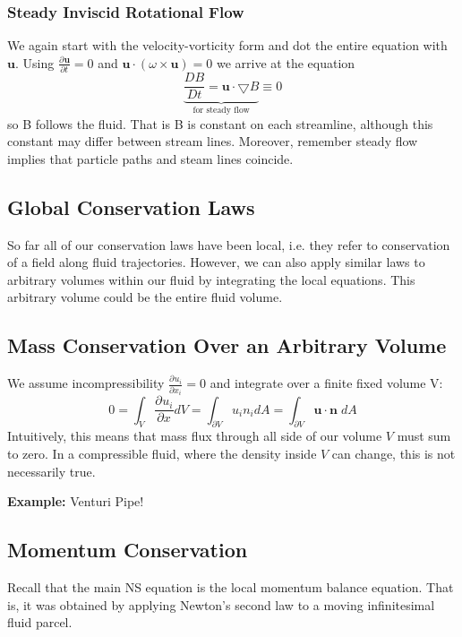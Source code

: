 \documentclass[11pt]{article}
\newcommand*{\pd}[3][]{\ensuremath{\frac{\partial^{#1} {#2}}{\partial {#3}^{#1}}}}
\newcommand*{\md}[1]{\ensuremath{\frac{D #1}{D t}}}
\newcommand{\grad}{\bigtriangledown}
\newcommand{\mv}[1]{\bm{#1}}
\newenvironment{eg}
{\begin{mdframed}[backgroundcolor=mylg, roundcorner=5pt, linewidth=0pt]\textbf{Example: }\normalfont}
    {\end{mdframed}}
\begin{document}
\subsubsection{Steady Inviscid Rotational Flow}
We again start with the velocity-vorticity form and dot the entire equation with $\mv{u}$. Using $\pd{\mv{u}}{t}=0$ and $\mv{u}\cdot(\omega\times\mv{u})=0$ we arrive at the equation
$$\underbrace{\md{B}=\mv{u}\cdot\grad B}_{\text{for steady flow}} \equiv 0$$
so B follows the fluid. That is B is constant on each streamline, although this constant may differ between stream lines. Moreover, remember steady flow implies that particle paths and steam lines coincide.
\subsection{Global Conservation Laws}
So far all of our conservation laws have been local, i.e. they refer to conservation of a field along fluid trajectories. However, we can also apply similar laws to arbitrary volumes within our fluid by integrating the local equations. This arbitrary volume could be the entire fluid volume.
\subsection{Mass Conservation Over an Arbitrary Volume}
We assume incompressibility $\pd{u_i}{x_i}=0$ and integrate over a finite fixed volume V:
$$0=\int_V \pd{u_i}{x}dV=\int_{\partial V}u_in_idA=\int_{\partial V}\mv{u}\cdot\mv{n}\;dA$$
Intuitively, this means that mass flux through all side of our volume $V$ must sum to zero. In a compressible fluid, where the density inside $V$ can change, this is not necessarily true.
\begin{eg}
Venturi Pipe!
\end{eg}
\subsection{Momentum Conservation}
Recall that the main NS equation is the local momentum balance equation. That is, it was obtained by applying Newton's second law to a moving infinitesimal fluid parcel.
\end{document}
